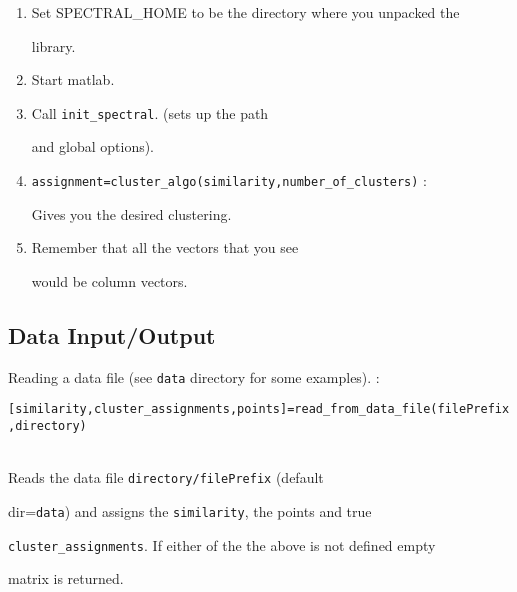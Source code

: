 \documentclass[10pt]{article}
\begin{document}
\begin{enumerate}

\item  Set \textsc{SPECTRAL\_HOME} to be the directory where you unpacked the

  library.  

\item  Start matlab.  

\item  Call \texttt{init\_spectral}. (sets up the path

  and global options).  

\item 

  \texttt{assignment=cluster\_algo(similarity,number\_of\_clusters)} :

  Gives you the  desired clustering.     

\item  Remember that all the vectors that you see

  would be column vectors.

\end{enumerate}







\subsection{Data Input/Output}

\label{sec:dataio}





Reading a data file (see \texttt{data} directory for some examples). : 



\texttt{[similarity,cluster\_assignments,points]=read\_from\_data\_file(filePrefix,directory)}

\\

Reads the data file \texttt{directory/filePrefix} (default

dir=\texttt{data}) and assigns the \texttt{similarity}, the points and true

\texttt{cluster\_assignments}. If either of the the above is not defined empty

matrix is returned.
\end{document}
